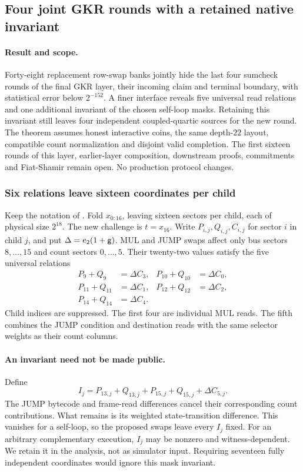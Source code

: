 \subsection{Four joint GKR rounds with a retained native invariant}\label{note:zk-four-round-tail}

\paragraph{Result and scope.} Forty-eight replacement row-swap banks jointly hide the last four sumcheck rounds of the final GKR layer, their incoming claim and terminal boundary, with statistical error below $2^{-152}$. A finer interface reveals five universal read relations and one additional invariant of the chosen self-loop masks. Retaining this invariant still leaves four independent coupled-quartic sources for the new round. The theorem assumes honest interactive coins, the same depth-$22$ layout, compatible count normalization and disjoint valid completion. The first sixteen rounds of this layer, earlier-layer composition, downstream proofs, commitments and Fiat-Shamir remain open. No production protocol changes.

\subsubsection{Six relations leave sixteen coordinates per child}

Keep the notation of . Fold $x_{0:16}$, leaving sixteen sectors per child, each of physical size $2^{18}$. The new challenge is $t=x_{16}$. Write $P_{i,j},Q_{i,j},C_{i,j}$ for sector $i$ in child $j$, and put $\Delta=e_2(1+\mathsf{g})$. MUL and JUMP swaps affect only bus sectors $8,\ldots,15$ and count sectors $0,\ldots,5$. Their twenty-two values satisfy the five universal relations
\[
\begin{aligned}
 P_9+Q_9&=\Delta C_3,& P_{10}+Q_{10}&=\Delta C_0,\\
 P_{11}+Q_{11}&=\Delta C_1,& P_{12}+Q_{12}&=\Delta C_2,\\
 P_{14}+Q_{14}&=\Delta C_4.
\end{aligned}
\]
Child indices are suppressed. The first four are individual MUL reads. The fifth combines the JUMP condition and destination reads with the same selector weights as their count columns.

\paragraph{An invariant need not be made public.} Define
\[
 I_j=P_{13,j}+Q_{13,j}+P_{15,j}+Q_{15,j}+\Delta C_{5,j}.
\]
The JUMP bytecode and frame-read differences cancel their corresponding count contributions. What remains is its weighted state-transition difference. This vanishes for a self-loop, so the proposed swaps leave every $I_j$ fixed. For an arbitrary complementary execution, $I_j$ may be nonzero and witness-dependent. We retain it in the analysis, not as simulator input. Requiring seventeen fully independent coordinates would ignore this mask invariant.

